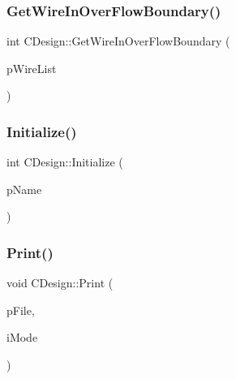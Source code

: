 \mbox{\label{classCDesign_acd4fc20284f55855b4e88d89cc03b058}} 
\subsubsection{\texorpdfstring{GetWireInOverFlowBoundary()}{GetWireInOverFlowBoundary()}}
{\footnotesize\ttfamily int C\+Design\+::\+Get\+Wire\+In\+Over\+Flow\+Boundary (\begin{DoxyParamCaption}\item[{hash\+\_\+map$<$ \mbox{\hyperlink{BoxRouter_8h_a280feb883e9d4a7edcc69c8bcb9f38f2}{A\+D\+D\+R\+E\+SS}}, int $>$ $\ast$}]{p\+Wire\+List }\end{DoxyParamCaption})}

\mbox{\label{classCDesign_a9a2909717e3b6947c6d685e13088be6d}} 
\subsubsection{\texorpdfstring{Initialize()}{Initialize()}}
{\footnotesize\ttfamily int C\+Design\+::\+Initialize (\begin{DoxyParamCaption}\item[{char $\ast$}]{p\+Name }\end{DoxyParamCaption})\hspace{0.3cm}{\ttfamily [virtual]}}

\mbox{\label{classCDesign_ae6f1b5262fb9420660bd768cb7ae613e}} 
\subsubsection{\texorpdfstring{Print()}{Print()}}
{\footnotesize\ttfamily void C\+Design\+::\+Print (\begin{DoxyParamCaption}\item[{F\+I\+LE $\ast$}]{p\+File,  }\item[{int}]{i\+Mode }\end{DoxyParamCaption})\hspace{0.3cm}{\ttfamily [virtual]}}



